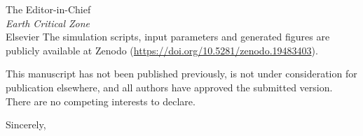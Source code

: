 \documentclass[11pt,a4paper]{letter}
\begin{document}
\begin{letter}{The Editor-in-Chief\\
\textit{Earth Critical Zone}\\
Elsevier}
The simulation scripts, input parameters and generated figures are publicly available at Zenodo (\url{https://doi.org/10.5281/zenodo.19483403}).

This manuscript has not been published previously, is not under consideration for publication elsewhere, and all authors have approved the submitted version. There are no competing interests to declare.

\closing{Sincerely,}

\end{letter}
\end{document}
